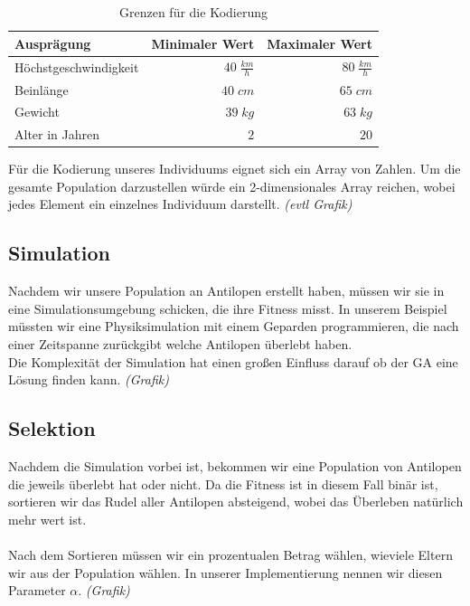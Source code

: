             \begin{table}[H]
                \begin{center}
                \begin{tabular}{ |l|r|r| } 
                    \hline
                    Ausprägung               & Minimaler Wert        & Maximaler Wert       \\ \hline
                    Höchstgeschwindigkeit    & $ 40\; \frac{km}{h}$  & $ 80\; \frac{km}{h}$ \\ \hline
                    Beinlänge                & $ 40\; cm          $  & $ 65\; cm          $ \\ \hline
                    Gewicht                  & $ 39\; kg          $  & $ 63\; kg          $ \\ \hline
                    Alter in Jahren          & $  2               $  & $ 20               $ \\ \hline
                \end{tabular}
                \end{center}
                \caption{Grenzen für die Kodierung \label{fig:somelabel}}
            \end{table}
            \noindent
            Für die Kodierung unseres Individuums eignet sich ein Array von Zahlen. Um die gesamte Population darzustellen würde ein 2-dimensionales Array reichen, wobei jedes Element ein einzelnes Individuum darstellt. \textit{(evtl Grafik)}

        \subsection{Simulation}
            Nachdem wir unsere Population an Antilopen erstellt haben, müssen wir sie in eine Simulationsumgebung schicken, die ihre Fitness misst. In unserem Beispiel müssten wir eine Physiksimulation mit einem Geparden programmieren, die nach einer Zeitspanne zurückgibt welche Antilopen überlebt haben. \\
            \noindent
            Die Komplexität der Simulation hat einen großen Einfluss darauf ob der GA eine Lösung finden kann. \textit{(Grafik)}


        \subsection{Selektion}

            Nachdem die Simulation vorbei ist, bekommen wir eine Population von Antilopen die jeweils überlebt hat oder nicht. Da die Fitness ist in diesem Fall binär ist, sortieren wir das Rudel aller Antilopen absteigend, wobei das Überleben natürlich mehr wert ist.\\
            \\
            Nach dem Sortieren müssen wir ein prozentualen Betrag wählen, wieviele Eltern wir aus der Population wählen. In unserer Implementierung nennen wir diesen Parameter $\alpha$. \textit{(Grafik)}

